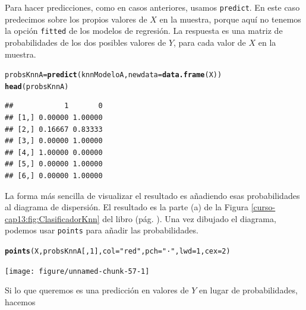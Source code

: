 \documentclass[10pt,a4paper]{article}\usepackage[]{graphicx}\usepackage[]{color}
\makeatletter
\newcommand{\hlnum}[1]{\textcolor[rgb]{0.686,0.059,0.569}{#1}}%
\newcommand{\hlstr}[1]{\textcolor[rgb]{0.192,0.494,0.8}{#1}}%
\newcommand{\hlstd}[1]{\textcolor[rgb]{0.345,0.345,0.345}{#1}}%
\newcommand{\hlkwb}[1]{\textcolor[rgb]{0.69,0.353,0.396}{#1}}%
\newcommand{\hlkwc}[1]{\textcolor[rgb]{0.333,0.667,0.333}{#1}}%
\newcommand{\hlkwd}[1]{\textcolor[rgb]{0.737,0.353,0.396}{\textbf{#1}}}%
\newenvironment{kframe}{%
 \def\at@end@of@kframe{}%
 \ifinner\ifhmode%
  \def\at@end@of@kframe{\end{minipage}}%
  \begin{minipage}{\columnwidth}%
 \fi\fi%
 \def\FrameCommand##1{\hskip\@totalleftmargin \hskip-\fboxsep
 \colorbox{shadecolor}{##1}\hskip-\fboxsep
     \hskip-\linewidth \hskip-\@totalleftmargin \hskip\columnwidth}%
 \MakeFramed {\advance\hsize-\width
   \@totalleftmargin\z@ \linewidth\hsize
   \@setminipage}}%
 {\par\unskip\endMakeFramed%
 \at@end@of@kframe}
\newenvironment{knitrout}{}{} %
\makeatother
\begin{document}
Para hacer predicciones, como en casos anteriores, usamos {\tt predict}. En este caso predecimos sobre los propios valores de $X$ en la muestra, porque aquí no tenemos la opción {\tt fitted} de los modelos de regresión. La respuesta es una matriz de probabilidades de los dos posibles valores de  $Y$, para cada valor de $X$ en la muestra.

\begin{knitrout}
\color{fgcolor}\begin{kframe}
\begin{alltt}
\hlstd{probsKnnA} \hlkwb{=} \hlkwd{predict}\hlstd{(knnModeloA,} \hlkwc{newdata} \hlstd{=} \hlkwd{data.frame}\hlstd{(X))}
\hlkwd{head}\hlstd{(probsKnnA)}
\end{alltt}
\begin{verbatim}
##            1       0
## [1,] 0.00000 1.00000
## [2,] 0.16667 0.83333
## [3,] 0.00000 1.00000
## [4,] 1.00000 0.00000
## [5,] 0.00000 1.00000
## [6,] 0.00000 1.00000
\end{verbatim}
\end{kframe}
\end{knitrout}

La forma más sencilla de  visualizar el resultado es añadiendo esas probabilidades al diagrama de dispersión.  El resultado es la parte (a) de la Figura \ref{curso-cap13:fig:ClasificadorKnn} del libro (pág. \pageref{curso-cap13:fig:ClasificadorKnn}). Una vez dibujado el diagrama, podemos usar {\tt points} para añadir las probabilidades.

\begin{knitrout}
\color{fgcolor}\begin{kframe}
\begin{alltt}
\hlkwd{points}\hlstd{(X, probsKnnA[ ,} \hlnum{1}\hlstd{],} \hlkwc{col}\hlstd{=}\hlstr{"red"}\hlstd{,} \hlkwc{pch}\hlstd{=}\hlstr{"·"}\hlstd{,} \hlkwc{lwd}\hlstd{=}\hlnum{1}\hlstd{,} \hlkwc{cex}\hlstd{=}\hlnum{2}\hlstd{)}
\end{alltt}
\end{kframe}

{\centering \texttt{[image: figure/unnamed-chunk-57-1]} 

}



\end{knitrout}

Si lo que queremos es una predicción en valores de $Y$ en lugar de probabilidades, hacemos
\end{document}
